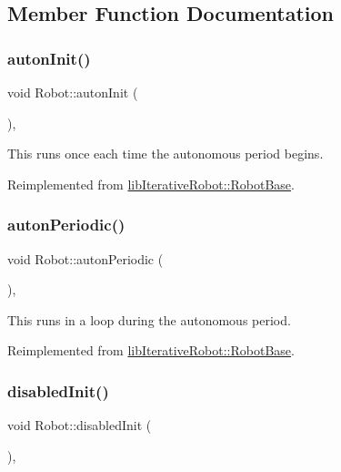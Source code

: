 \subsection{Member Function Documentation}
\mbox{\label{class_robot_af5bd4d345ec522b70bdc5cf2b17ffa49}} 
\subsubsection{\texorpdfstring{autonInit()}{autonInit()}}
{\footnotesize\ttfamily void Robot\+::auton\+Init (\begin{DoxyParamCaption}{ }\end{DoxyParamCaption})\hspace{0.3cm}{\ttfamily [protected]}, {\ttfamily [virtual]}}

This runs once each time the autonomous period begins. 

Reimplemented from \mbox{\hyperlink{classlib_iterative_robot_1_1_robot_base_a8137d84aef11ed00a46cbc1bbb727a60}{lib\+Iterative\+Robot\+::\+Robot\+Base}}.

\mbox{\label{class_robot_a51cab9afb43b369593ca189101b25b26}} 
\subsubsection{\texorpdfstring{autonPeriodic()}{autonPeriodic()}}
{\footnotesize\ttfamily void Robot\+::auton\+Periodic (\begin{DoxyParamCaption}{ }\end{DoxyParamCaption})\hspace{0.3cm}{\ttfamily [protected]}, {\ttfamily [virtual]}}

This runs in a loop during the autonomous period. 

Reimplemented from \mbox{\hyperlink{classlib_iterative_robot_1_1_robot_base_ac34d3dcb9388d4a8564eb781919eb825}{lib\+Iterative\+Robot\+::\+Robot\+Base}}.

\mbox{\label{class_robot_a34f8bfa41ab64deae701c5583f619e78}} 
\subsubsection{\texorpdfstring{disabledInit()}{disabledInit()}}
{\footnotesize\ttfamily void Robot\+::disabled\+Init (\begin{DoxyParamCaption}{ }\end{DoxyParamCaption})\hspace{0.3cm}{\ttfamily [protected]}, {\ttfamily [virtual]}}

